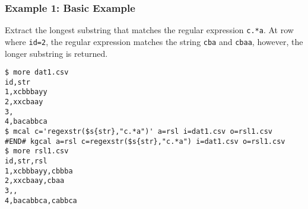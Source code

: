 \subsubsection*{Example 1: Basic Example}

Extract the longest substring that matches the regular expression \verb|c.*a|. At row where \verb|id=2|, the regular expression matches the string \verb|cba| and \verb|cbaa|, however, the longer substring is returned.


\begin{Verbatim}[baselinestretch=0.7,frame=single]
$ more dat1.csv
id,str
1,xcbbbayy
2,xxcbaay
3,
4,bacabbca
$ mcal c='regexstr($s{str},"c.*a")' a=rsl i=dat1.csv o=rsl1.csv
#END# kgcal a=rsl c=regexstr($s{str},"c.*a") i=dat1.csv o=rsl1.csv
$ more rsl1.csv
id,str,rsl
1,xcbbbayy,cbbba
2,xxcbaay,cbaa
3,,
4,bacabbca,cabbca
\end{Verbatim}
